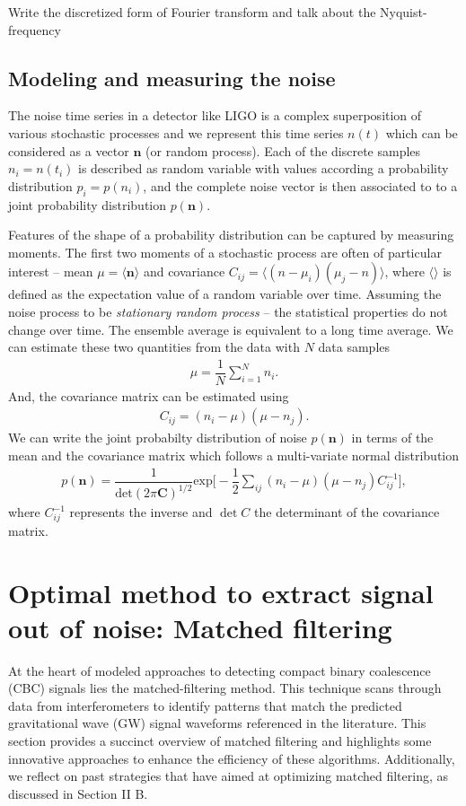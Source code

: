 Write the discretized form of Fourier transform and talk about the Nyquist-frequency

\subsection{Modeling and measuring the noise}
The noise time series in a detector like LIGO is a complex superposition of various stochastic processes and we represent this time series $n(t)$ which can be considered as a vector $\textbf{n}$ (or random process). Each of the discrete samples $n_i = n(t_i)$ is described as random variable with values according a probability distribution $p_i = p(n_i)$, and the complete noise vector is then associated to to a joint probability distribution $p(\textbf{n})$. 

Features of the shape of a probability distribution can be captured by measuring moments. The first two moments of a stochastic process are often of particular interest -- mean $\mu = \langle \textbf{n}\rangle$ and covariance $C_{ij} = \langle(n-\mu_{i})(\mu_{j}-n)\rangle$, where $\langle\rangle$ is defined as the expectation value of a random variable over time. Assuming the noise process to be \textit{stationary random process} -- the statistical properties do not change over time. The ensemble average is equivalent to a long time average. We can estimate these two quantities from the data with $N$ data samples
\begin{align}
    \mu = \dfrac{1}{N}\sum_{i=1}^{N}n_{i}.
    \label{eq:mean-noise-series}
\end{align}
And, the covariance matrix can be estimated using
\begin{align}
    C_{ij} = (n_{i} - \mu)(\mu - n_j).
    \label{eq:covariance-noise-series}
\end{align}
We can write the joint probabilty distribution of noise $p(\textbf{n})$ in terms of the mean and the covariance matrix which follows a multi-variate normal distribution
\begin{align}
    p(\textbf{n}) = \dfrac{1}{\text{det}(2\pi \textbf{C})^{1/2}}\text{exp}\Bigg[-\dfrac{1}{2} \sum_{ij}(n_{i} - \mu)(\mu - n_j) C_{ij}^{-1} \Bigg],
    \label{eq:joint-pdf-noise}
\end{align}
where $C_{ij}^{-1}$ represents the inverse and $\det{C}$ the determinant of the covariance matrix.


\section{Optimal method to extract signal out of noise: Matched filtering}
At the heart of modeled approaches to detecting compact binary coalescence (CBC) signals lies the matched-filtering method. This technique scans through data from interferometers to identify patterns that match the predicted gravitational wave (GW) signal waveforms referenced in the literature. This section provides a succinct overview of matched filtering and highlights some innovative approaches to enhance the efficiency of these algorithms. Additionally, we reflect on past strategies that have aimed at optimizing matched filtering, as discussed in Section II B.

